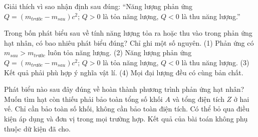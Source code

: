 \begin{bt}
Giải thích vì sao nhận định sau đúng: “Năng lượng phản ứng $Q=(m_{trước}-m_{sau})c^2$; $Q>0$ là tỏa năng lượng, $Q<0$ là thu năng lượng.”
\end{bt}

\begin{ex}
Trong bốn phát biểu sau về tính năng lượng tỏa ra hoặc thu vào trong phản ứng hạt nhân, có bao nhiêu phát biểu đúng? Chỉ ghi một số nguyên. (1) Phản ứng có $m_{sau}\gt m_{trước}$ luôn tỏa năng lượng. (2) Năng lượng phản ứng $Q=(m_{trước}-m_{sau})c^2$; $Q>0$ là tỏa năng lượng, $Q<0$ là thu năng lượng. (3) Kết quả phải phù hợp ý nghĩa vật lí. (4) Mọi đại lượng đều có cùng bản chất.
\end{ex}

\begin{ex}
Phát biểu nào sau đây đúng về hoàn thành phương trình phản ứng hạt nhân?
\choice
{\True Muốn tìm hạt còn thiếu phải bảo toàn tổng số khối $A$ và tổng điện tích $Z$ ở hai vế.}
{Chỉ cần bảo toàn số khối, không cần bảo toàn điện tích.}
{Có thể bỏ qua điều kiện áp dụng và đơn vị trong mọi trường hợp.}
{Kết quả của bài toán không phụ thuộc dữ kiện đã cho.}
\end{ex}

